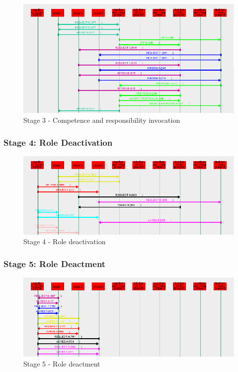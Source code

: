 \begin{figure}[H]
	\centering
	\includegraphics[width=\textwidth]{images/example3-stage3.png}
	\caption{Stage 3 - Competence and responsibility invocation}
	\label{figure:example3-stage3}
\end{figure}

\subsubsection*{Stage 4: Role Deactivation}

\begin{figure}[H]
	\centering
	\includegraphics[width=\textwidth]{images/example3-stage4.png}
	\caption{Stage 4 - Role deactivation}
	\label{figure:example3-stage4}
\end{figure}

\subsubsection*{Stage 5: Role Deactment}

\begin{figure}[H]
	\centering
	\includegraphics[width=\textwidth]{images/example3-stage5.png}
	\caption{Stage 5 - Role deactment}
	\label{figure:example3-stage5}
\end{figure} 